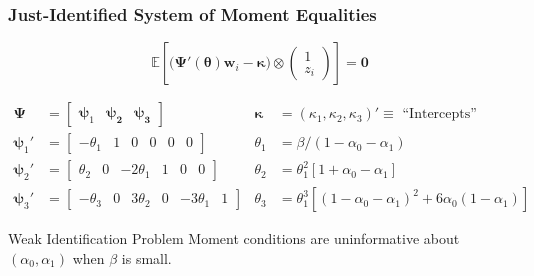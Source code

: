 \documentclass{beamer}
\begin{document}
\begin{frame}
  \frametitle{Just-Identified System of Moment Equalities}

\[
\boxed{\mathbb{E}\left[
  \big(\boldsymbol{\Psi}'(\boldsymbol{\theta})\mathbf{w}_i - \boldsymbol{\kappa}\big) \otimes 
\left(
\begin{array}{c}
  1 \\ z_i
\end{array}\right)
\right] = \mathbf{0}}
\]

\footnotesize
\begin{align*}
\boldsymbol{\Psi} &= \left[
  \begin{array}{ccc}
    \boldsymbol{\psi}_1 & \boldsymbol{\psi_2} & \boldsymbol{\psi_3}
\end{array}\right]
& \boldsymbol{\kappa} &= (\kappa_1, \kappa_2, \kappa_3)' \equiv \mbox{ ``Intercepts''}\\
  \boldsymbol{\psi}_1' &= \left[
  \begin{array}{cccccc}
-\theta_1 & 1 & 0 & 0 & 0 & 0
  \end{array}
\right] & \theta_1 &= \beta / (1 - \alpha_0 - \alpha_1)\\
  \boldsymbol{\psi}_2' &= \left[
  \begin{array}{cccccc}
\theta_2& 0& -2\theta_1& 1& 0& 0
  \end{array}
\right] & \theta_2 &= \theta_1^2 \left[ 1 + \alpha_0 - \alpha_1 \right]\\
  \boldsymbol{\psi}_3' &= \left[
  \begin{array}{cccccc}
-\theta_3& 0& 3\theta_2& 0& -3\theta_1& 1
  \end{array}
\right] & \theta_3 &= \theta_1^3 \left[ \left( 1 - \alpha_0 - \alpha_1 \right)^2 + 6\alpha_0 (1 - \alpha_1) \right] 
\end{align*}

\begin{alertblock}{Weak Identification Problem}
  Moment conditions are uninformative about $(\alpha_0,\alpha_1)$ when $\beta$ is small.
\end{alertblock}



\end{frame}
\end{document}
